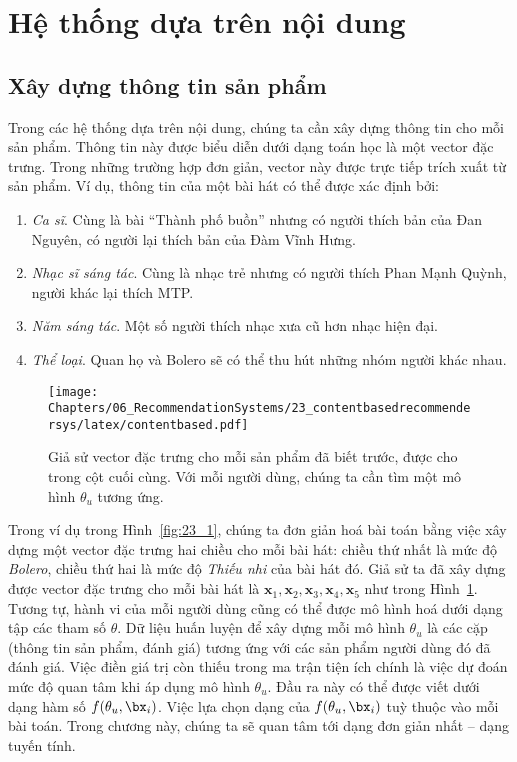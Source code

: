 \section{Hệ thống dựa trên nội dung}


\subsection{Xây dựng thông tin sản phẩm}

Trong các hệ thống dựa trên nội dung, chúng ta cần xây dựng thông tin cho mỗi sản phẩm. Thông tin này được biểu diễn
dưới dạng toán học là một vector đặc trưng. Trong những trường hợp đơn giản,
vector này được trực tiếp trích xuất từ sản phẩm. Ví dụ, thông tin của một bài hát có thể được xác định bởi:
\begin{enumerate}
\item \textit{Ca sĩ}. Cùng là bài ``{Thành phố buồn}'' nhưng có người thích bản của Đan Nguyên, có người lại thích bản của Đàm Vĩnh Hưng.
\item \textit{Nhạc sĩ sáng tác}. Cùng là nhạc trẻ nhưng có người thích Phan Mạnh Quỳnh, người khác lại thích MTP.
\item \textit{Năm sáng tác}. Một số người thích nhạc xưa cũ hơn nhạc hiện đại.
\item \textit{Thể loại}. Quan họ và Bolero sẽ có thể thu hút những nhóm người khác nhau.
\end{enumerate}

\begin{figure}[t]
\centering
\texttt{[image: Chapters/06\_RecommendationSystems/23\_contentbasedrecommendersys/latex/contentbased.pdf]}
\caption[]{Giả sử vector đặc trưng cho mỗi sản phẩm đã biết trước, được cho trong cột cuối
cùng. Với mỗi người dùng, chúng ta cần tìm một mô hình \(\theta_u\) tương
ứng.}
\label{fig:23_2}
\end{figure}
Trong ví dụ trong Hình~\ref{fig:23_1}, chúng ta đơn giản hoá bài toán bằng việc
xây dựng một vector đặc trưng hai chiều cho mỗi bài hát: chiều thứ nhất là mức
độ \textit{Bolero}, chiều thứ hai là mức độ \textit{Thiếu nhi} của bài hát đó.
Giả sử ta đã xây dựng được vector đặc trưng cho mỗi bài hát là $\mathbf{x}_1, \mathbf{x}_2,
\mathbf{x}_3, \mathbf{x}_4, \mathbf{x}_5$ như trong Hình~\ref{fig:23_2}. Tương
tự, hành vi của mỗi người dùng cũng có thể được mô hình hoá dưới dạng tập các
tham số $\theta$. Dữ liệu huấn luyện để xây dựng mỗi mô hình $\theta_u$ là các
cặp (thông tin sản phẩm, đánh giá) tương ứng với các sản phẩm người dùng đó đã đánh giá. Việc điền giá trị còn thiếu trong ma trận
tiện ích chính là việc dự đoán mức độ quan tâm khi áp dụng mô hình $\theta_u$. Đầu ra này có thể được viết dưới dạng hàm số $f(\theta_u,
\bx_i)$. Việc lựa chọn dạng của $f(\theta_u, \bx_i)$ tuỳ thuộc vào mỗi bài toán.
Trong chương này, chúng ta sẽ quan tâm tới dạng đơn giản nhất -- dạng tuyến tính.


